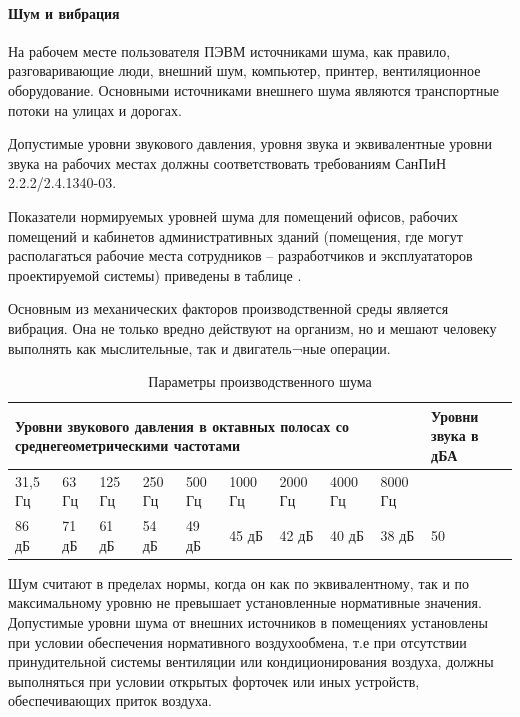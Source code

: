 \paragraph{Шум и вибрация}

На рабочем месте пользователя ПЭВМ источниками шума, как правило, разговаривающие люди, внешний шум, компьютер, принтер, вентиляционное оборудование. Основными источниками внешнего шума являются транспортные потоки на улицах и дорогах.

Допустимые уровни звукового давления, уровня звука и эквивалентные уровни звука на рабочих местах должны соответствовать требованиям СанПиН 2.2.2/2.4.1340-03.

Показатели нормируемых уровней шума для помещений офисов, рабочих помещений и кабинетов административных зданий (помещения, где могут располагаться рабочие места сотрудников – разработчиков и эксплуататоров проектируемой системы) приведены в таблице .

Основным из механических факторов производственной среды является вибрация. Она не только вредно действуют на организм, но и мешают человеку выполнять как мыслительные, так и двигатель¬ные операции. 

\begin{table}[!htb]
	\caption{Параметры производственного шума}\label{bzd:noize}
    \centering
	\begin{tabular}{|p{1cm}|p{1cm}|p{1cm}|p{1cm}|p{1cm}|p{1cm}|p{1cm}|p{1cm}|p{1cm}|p{2cm}|}
	\hline 
	\multicolumn{9}{|p{12cm}|}{Уровни звукового давления в октавных полосах со среднегеометрическими частотами} & Уровни звука в дБА \\ 
	\hline 
	31,5 Гц & 63 Гц & 125 Гц & 250 Гц & 500 Гц & 1000 Гц & 2000 Гц & 4000 Гц & 8000 Гц & ~\ \\ 
	\hline 
	86 дБ & 71 дБ & 61 дБ & 54 дБ & 49 дБ & 45 дБ & 42 дБ & 40 дБ & 38 дБ & 50 \\ 
	\hline 
	\end{tabular} 
    		
\end{table}

Шум считают в пределах нормы, когда он как по эквивалентному, так и по максимальному уровню не превышает установленные нормативные значения.
Допустимые уровни шума от внешних источников в помещениях установлены при условии обеспечения нормативного воздухообмена, т.е при отсутствии принудительной системы вентиляции или кондиционирования воздуха, должны выполняться при условии открытых форточек или иных устройств, обеспечивающих приток воздуха.

